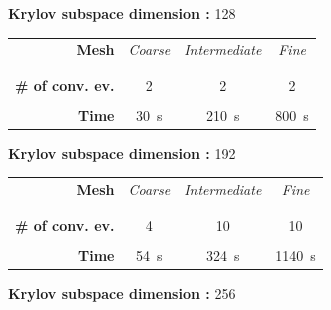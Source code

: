 \documentclass[aspectratio=169, usenames, dvipsnames]{beamer}
\begin{document}
{

  \begin{frame}
    \vfill
    \begin{minipage}{.28\textwidth}
    \end{minipage}%
    \hfill
    \begin{minipage}{.68\textwidth}
      \centering
      \textbf{Krylov subspace dimension :} 128
      
      \bigskip
      
      \begin{tabular}{rccc}
        \textbf{Mesh} & \emph{Coarse} & \emph{Intermediate} & \emph{Fine} \\
        \\
        \hline \\
        \textbf{\# of conv. ev.} & 2 & 2 & 2 \\
        \\
        \textbf{Time} & 30~\unit{\s} & 210~\unit{\s} & 800~\unit{\s}
      \end{tabular}
    \end{minipage}
    \vfill
  \end{frame}

  \begin{frame}
    \vfill
    \begin{minipage}{.28\textwidth}
    \end{minipage}%
    \hfill
    \begin{minipage}{.68\textwidth}
      \centering
      \textbf{Krylov subspace dimension :} 192
      
      \bigskip
      
      \begin{tabular}{rccc}
        \textbf{Mesh} & \emph{Coarse} & \emph{Intermediate} & \emph{Fine} \\
        \\
        \hline \\
        \textbf{\# of conv. ev.} & 4 & 10 & 10 \\
        \\
        \textbf{Time} & 54~\unit{\s} & 324~\unit{\s} & 1140~\unit{\s}
      \end{tabular}
    \end{minipage}
    \vfill
  \end{frame}

  \begin{frame}
    \vfill
    \begin{minipage}{.28\textwidth}
    \end{minipage}%
    \hfill
    \begin{minipage}{.68\textwidth}
      \centering
      \textbf{Krylov subspace dimension :} 256
      

\end{minipage}
\end{frame}}
\end{document}
